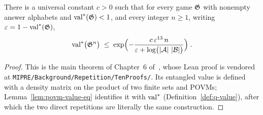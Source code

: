 \begin{theorem}
\label{thm:direct-repetition-q}
\leanok
\qlib{}
There is a universal constant $c > 0$ such that for every game $\mathfrak{G}$ with nonempty
answer alphabets and $\mathrm{val}^*(\mathfrak{G}) < 1$, and every integer $n \geq 1$, writing
$\varepsilon = 1 - \mathrm{val}^*(\mathfrak{G})$,
\begin{equation*}
  \mathrm{val}^*\bigl( \mathfrak{G}^{n} \bigr) \;\leq\;
  \exp\Bigl( - \frac{c\, \varepsilon^{13}\, n}{\varepsilon + \log\bigl(\left\vert {\ensuremath{\mathcal{A}}} \right\vert\,\left\vert {\ensuremath{\mathcal{B}}} \right\vert\bigr)} \Bigr)\;.
\end{equation*}
\end{theorem}
\begin{proof}
\leanok
This is the main theorem of Chapter~6 of~\cite{OpenAI26}, whose Lean proof is vendored
at \texttt{MIPRE/Background/Repetition/TenProofs/}. Its entangled value is defined with
a density matrix on the product of two finite sets and POVMs; Lemma~\ref{lem:povm-value-eq}
identifies it with $\mathrm{val}^*$ (Definition~\ref{def:q-value}), after which the two direct
repetitions are literally the same construction.
\end{proof}

\effortMedium\ \qlib

